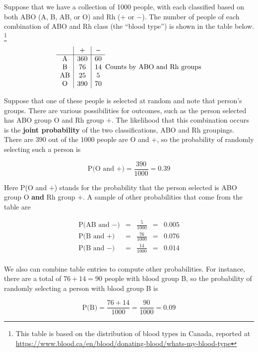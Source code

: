 \documentclass[
]{book}
\begin{document}
Suppose that we have a collection of 1000 people, with each classified based on both
ABO (A, B, AB, or O) and Rh (\(+\) or \(-\)).
The number of people of each combination of ABO and Rh class (the ``blood type'') is shown
in the table below. \footnote{This table is based on the distribution of blood types in Canada, reported at \url{https://www.blood.ca/en/blood/donating-blood/whats-my-blood-type}}

\[
\begin{array}{c|c|c}
       & + & - \\ \hline
\mathrm{A} & 360 & 60 \\ 
\mathrm{B} & 76 & 14 \\ 
\mathrm{AB} & 25 & 5 \\ 
\mathrm{O} & 390 & 70 \\ 
\end{array}\\
\mbox{Counts by ABO and Rh groups}
\]

Suppose that one of these people is selected at random and note that person's groups.
There are various possibilities for outcomes, such as the person selected has
ABO group O and Rh group \(+\).
The likelihood that this combination occurs is the \textbf{joint probability} of the two classifications,
ABO and Rh groupings.
There are 390 out of the 1000 people are O and \(+\), so the probability of randomly
selecting such a person is

\[\text{P(O and +)} = \frac{390}{1000} = 0.39\]

Here P(O and \(+\)) stands for the probability that the person selected is
ABO group O \textbf{and} Rh group \(+\).
A sample of other probabilities that come from the table are

\[\begin{array}{rcccl}
\text{P(AB and }-) & = & {\displaystyle\frac{5}{1000}} & = & 0.005 \\[5pt]
\text{P(B and +)} & = & {\displaystyle\frac{76}{1000}} & = & 0.076 \\[5pt]
\text{P(B and }-) & = & {\displaystyle\frac{14}{1000}} & = & 0.014 \\
\end{array}\]

We also can combine table entries to compute other probabilities.
For instance, there are a total of \(76 + 14 = 90\) people with blood group B,
so the probability of randomly selecting a person with blood group B is

\[
\mbox{P(B)} = \frac{76+14}{1000} = \frac{90}{1000} = 0.09
\]
\end{document}
